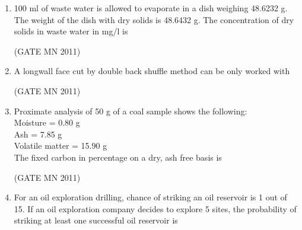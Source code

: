 \documentclass[journal]{IEEEtran}
\begin{document}
\begin{enumerate}
\item 
100 ml of waste water is allowed to evaporate in a dish weighing 48.6232 g. The weight of the dish with dry solids is 48.6432 g. The concentration of dry solids in waste water in mg/l is

\hfill(GATE MN 2011)
\begin{enumerate}
\end{enumerate}

\item 
A longwall face cut by double back shuffle method can be only worked with 

\hfill(GATE MN 2011)
\begin{enumerate}
\end{enumerate}

\item 
Proximate analysis of 50 g of a coal sample shows the following: \\
Moisture = 0.80 g \\
Ash = 7.85 g \\
Volatile matter = 15.90 g \\
The fixed carbon in percentage on a dry, ash free basis is 

\hfill(GATE MN 2011)
\begin{enumerate}
\end{enumerate}

\item 
For an oil exploration drilling, chance of striking an oil reservoir is 1 out of 15. If an oil exploration company decides to explore 5 sites, the probability of striking at least one successful oil reservoir is 


\end{enumerate}
\end{document}

